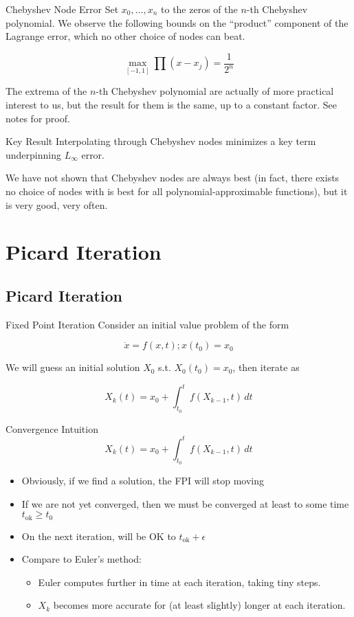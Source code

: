 \documentclass[pdf]{beamer}
\begin{document}
\begin{frame}{Chebyshev Node Error}
  Set $x_0,\ldots,x_n$ to the zeros of the $n$-th Chebyshev polynomial.
  We observe the following bounds on the ``product'' component of the
  Lagrange error, which no other choice of nodes can beat.

  \[ \max_{[-1,1]} \prod(x-x_j) = \frac{1}{2^n}\]

  The extrema of the $n$-th Chebyshev polynomial are actually of more practical
  interest to us, but the result for them is the same, up to a constant
  factor. See notes for proof.\end{frame}

\begin{frame}{Key Result}
  Interpolating through Chebyshev nodes minimizes a key term underpinning
  $L_\infty$ error.\newline

  We have not shown that Chebyshev nodes are always best (in fact, there exists no
  choice of nodes with is best for all polynomial-approximable functions), but
  it is very good, very often.
\end{frame}

\section{Picard Iteration}
\subsection{Picard Iteration}

\begin{frame}{Fixed Point Iteration}
  Consider an initial value problem of the form

  \[ \dot{x} = f(x, t); x(t_0) = x_0 \]

  We will guess an initial solution $X_0$ s.t. $X_0(t_0) = x_0$, then iterate as

  \[X_k(t) = x_0 + \int_{t_0}^t f(X_{k-1},t)  \, dt\]

\end{frame}

\begin{frame}{Convergence Intuition}
  \[X_k(t) = x_0 + \int_{t_0}^t f(X_{k-1},t)  \, dt\]

  \begin{itemize}
  \item Obviously, if we find a solution, the FPI will stop moving
  \item If we are not yet converged, then we must be converged at least to some time $t_{\text{ok}} \geq t_0$
  \item On the next iteration, will be OK to $t_\text{ok}+\epsilon$
  \item Compare to Euler's method:
    \begin{itemize}
    \item Euler computes further in time at each iteration, taking tiny steps.
    \item $X_k$ becomes more accurate for (at least slightly) longer at each iteration.
    \end{itemize}
  \end{itemize}
\end{frame}  
\end{document}
